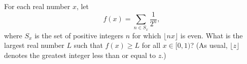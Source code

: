 For each real number $x$, let
\[
f(x) = \sum_{n\in S_x} \frac{1}{2^n},
\]
where $S_x$ is the set of positive integers $n$ for which $\lfloor nx \rfloor$ is even. What is the largest real number $L$ such that $f(x) \geq L$ for all $x \in [0,1)$? (As usual, $\lfloor z \rfloor$ denotes the greatest integer less than or equal to $z$.)
